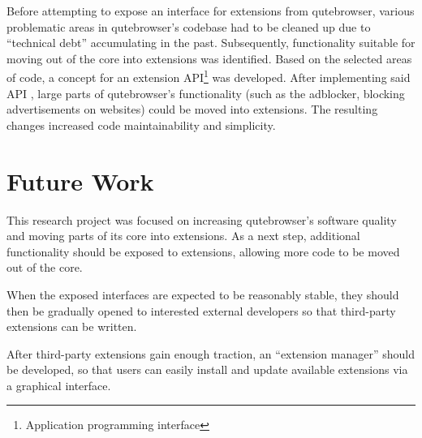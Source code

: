 Before attempting to expose an interface for extensions from qutebrowser,
various problematic areas in qutebrowser's codebase had to be cleaned up due to
``technical debt'' accumulating in the past. Subsequently, functionality
suitable for moving out of the core into extensions was identified. Based on
the selected areas of code, a concept for an extension API\footnote{Application
programming interface} was developed. After implementing said API , large parts
of qutebrowser's functionality (such as the adblocker, blocking advertisements
on websites) could be moved into extensions. The resulting changes increased
code maintainability and simplicity.

\section*{Future Work}
This research project was focused on increasing qutebrowser's software quality
and moving parts of its core into extensions. As a next step, additional
functionality should be exposed to extensions, allowing more code to be moved
out of the core.

When the exposed interfaces are expected to be reasonably stable,
they should then be gradually opened to interested external developers so that
third-party extensions can be written.

After third-party extensions gain enough traction, an ``extension manager''
should be developed, so that users can easily install and update available
extensions via a graphical interface.